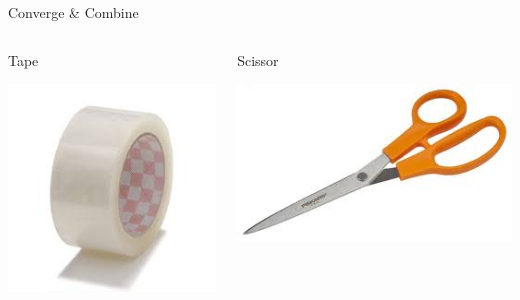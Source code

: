 \documentclass[notes]{beamer}
\begin{document}
\begin{frame}{Converge \& Combine}
		\begin{columns}
		\begin{column}{0.3\textwidth}
			\begin{center}
				Tape
			\end{center}
			\includegraphics[width=\textwidth]{img/tape.png}
		\end{column} \pause
		\begin{column}{0.3\textwidth}
			\begin{center}
				Scissor
			\end{center}
			\includegraphics[width=\textwidth]{img/scissor.png}

\end{column}
\end{columns}
\end{frame}
\end{document}
